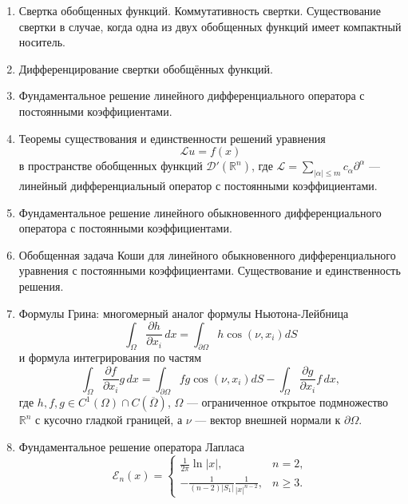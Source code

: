 \documentclass[12pt,a4paper,draft]{article}
\DeclareRobustCommand*{\т}{~--- }
\DeclareRobustCommand*{\ч}{~-- }
\begin{document}
\begin{enumerate}
\item
Свертка обобщенных функций. Коммутативность свертки. Существование
свертки в случае, когда одна из двух обобщенных функций имеет
компактный носитель.

\item
Дифференцирование свертки обобщённых функций.


\item
Фундаментальное решение линейного дифференциального оператора с
постоянными коэффициентами.

\item
Теоремы существования и единственности решений уравнения
$$
    {\mathcal L}
    u
    =
    f (x)
$$
в пространстве обобщенных функций ${\mathcal D}' ({\mathbb R}^n)$,
где $
    {\mathcal L}
    =
    \sum_{
        |\alpha| \le m
    }
    c_\alpha
    \partial^\alpha
$
--- линейный дифференциальный оператор с постоянными коэффициентами.

\item
Фундаментальное решение линейного обыкновенного дифференциального
оператора с постоянными коэффициентами.

\item
Обобщенная задача Коши для линейного обыкновенного
дифференциального уравнения с постоянными коэффициентами.
Существование и единственность решения.

\item
Формулы Грина: многомерный аналог формулы Ньютона-Лейбница
$$
    \int_\Omega
    \frac{\partial h}{\partial x_i}
    \,
    dx
    =
    \int_{
        \partial \Omega
    }
    h
    \cos (\nu, x_i)
    dS
$$
и формула интегрирования по частям
$$
    \int_\Omega
    \frac{\partial f}{\partial x_i}
    g
    \,
    dx
    =
    \int_{
        \partial \Omega
    }
    fg
    \cos (\nu, x_i)
    dS
    -
    \int_\Omega
    \frac{\partial g}{\partial x_i}
    f
    \,
    dx,
$$
где $h,f,g \in C^1 (\Omega) \cap C (\overline \Omega)$, $\Omega$
--- ограниченное открытое подмножество ${\mathbb R}^n$ с кусочно
гладкой границей, а $\nu$ --- вектор внешней нормали к $\partial
\Omega$.

\item
Фундаментальное решение оператора Лапласа
$$
    {\mathcal E}_n (x)
    =
    \left\{
        \begin{array}{ll}
            \frac{1}{2 \pi}
            \ln |x|,
            &
            n = 2,
            \\
            - \frac{
                1
            }{
                (n - 2)
                |S_1|
            }
            \frac{
                1
            }{
                |x|^{n - 2}
            },
            &
            n \ge 3.
        \end{array}
    \right.
$$


\end{enumerate}
\end{document}
